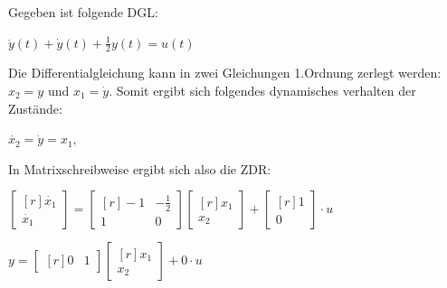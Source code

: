 \begin{minipage}[c]{0.48\columnwidth}
    Gegeben ist folgende DGL:
\end{minipage}
\hfill
\begin{minipage}[c]{0.48\columnwidth}
    \begin{flushleft}
        \( \ddot{y}(t) + \dot{y}(t) + \frac{1}{2}y(t) = u(t) \)
    \end{flushleft}
\end{minipage}
\par\vspace{0.1cm}
Die Differentialgleichung kann in zwei Gleichungen 1.Ordnung zerlegt werden: $ x_2 = y $
und $ x_1 = \dot{y} $. Somit ergibt sich folgendes dynamisches verhalten der Zustände:
\par\vspace{0.1cm}
\begin{minipage}[c]{0.48\columnwidth}
    \( \dot{x_2} = \dot{y} = x_1, \)
\end{minipage}
\hfill
\begin{minipage}[c]{0.48\columnwidth}
    \hspace*{-3.4cm}
\end{minipage}
\par\vspace{0.1cm}
In Matrixschreibweise ergibt sich also die ZDR:
\par\vspace{0.1cm}
\begin{minipage}[c]{0.48\columnwidth}
    \( \begin{bmatrix*}[r] \dot{x_1} \\ \dot{x_1} \end{bmatrix*} = 
    \begin{bmatrix*}[r] -1 & -\frac{1}{2} \\ 1 & 0 \end{bmatrix*} \begin{bmatrix*}[r] x_1 \\ x_2 \end{bmatrix*} +
    \begin{bmatrix*}[r] 1 \\ 0 \end{bmatrix*} \cdot u\)
\end{minipage}
\hfill
\begin{minipage}[c]{0.48\columnwidth}
    \begin{flushleft}
        \( y = \begin{bmatrix*}[r] 0 & 1 \end{bmatrix*} \begin{bmatrix*}[r] x_1 \\ x_2 \end{bmatrix*} 
        +0 \cdot u\)
    \end{flushleft}
\end{minipage}

